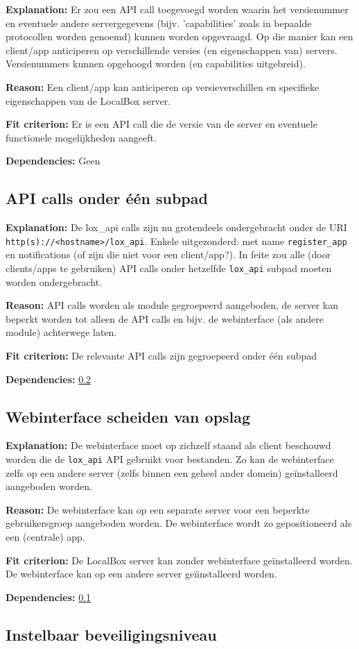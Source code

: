 \documentclass[[11pt,a4paper]{article}
\newcommand\requirement[2]{\subsection{#2}\label{#1}}
\newcommand\explanation{\noindent\textbf{Explanation: }}
\newcommand\reason{\noindent\textbf{Reason: }}
\newcommand\criterion{\noindent\textbf{Fit criterion: }}
\newcommand\dependencies{\noindent\textbf{Dependencies: }}
\begin{document}
    \explanation Er zou een API call toegevoegd worden waarin het versienummer en eventuele andere servergegevens (bijv. 'capabilities' zoals in bepaalde protocollen worden genoemd) kunnen worden opgevraagd. Op die manier kan een client/app anticiperen op verschillende versies (en eigenschappen van) servers. Versienummers kunnen opgehoogd worden (en capabilities uitgebreid).

    \reason Een client/app kan anticiperen op versieverschillen en specifieke eigenschappen van de LocalBox server.
    
    \criterion Er is een API call die de versie van de server en eventuele functionele mogelijkheden aangeeft.

    \dependencies Geen


\requirement{subpad}{API calls onder \'{e}\'{e}n subpad}

    \explanation De lox\_api calls zijn nu grotendeels ondergebracht onder de URI \texttt{http(s)://<hostname>/lox\_api}. Enkele uitgezonderd: met name \texttt{register\_app} en notifications (of zijn die niet voor een client/app?). In feite zou alle (door clients/apps te gebruiken) API calls onder hetzelfde \texttt{lox\_api} subpad moeten worden ondergebracht. 

    \reason API calls worden als module gegroepeerd aangeboden, de server kan beperkt worden tot alleen de API calls en bijv. de webinterface (als andere module) achterwege laten.

    \criterion De relevante API calls zijn gegroepeerd onder \'{e}\'{e}n subpad

    \dependencies \ref{wegint}


\requirement{wegint}{Webinterface scheiden van opslag}

    \explanation De webinterface moet op zichzelf staand als client beschouwd worden die de \texttt{lox\_api} API gebruikt voor bestanden. Zo kan de webinterface zelfs op een andere server (zelfs binnen een geheel ander domein) geïnstalleerd aangeboden worden.

    \reason De webinterface kan op een separate server voor een beperkte gebruikersgroep aangeboden worden. De webinterface wordt zo gepositioneerd als een (centrale) app.
    
    \criterion De LocalBox server kan zonder webinterface ge\"{i}nstalleerd worden. De webinterface kan op een andere server ge\"{i}installeerd worden.

    \dependencies \ref{subpad}


\requirement{defconf}{Instelbaar beveiligingsniveau}
\end{document}
